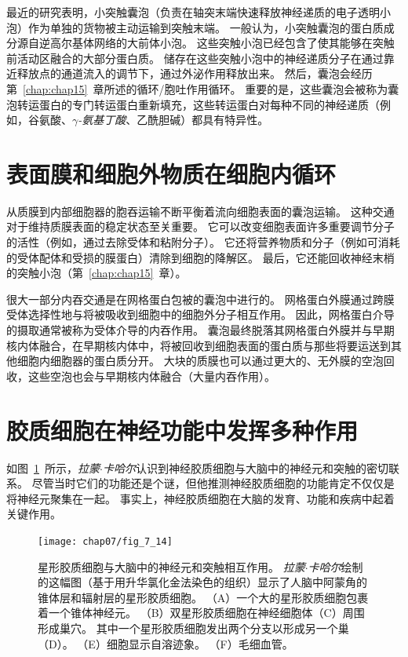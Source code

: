 最近的研究表明，小突触囊泡（负责在轴突末端快速释放神经递质的电子透明小泡）作为单独的货物被主动运输到突触末端。
一般认为，小突触囊泡的蛋白质成分源自逆高尔基体网络的大前体小泡。
这些突触小泡已经包含了使其能够在突触前活动区融合的大部分蛋白质。
储存在这些突触小泡中的神经递质分子在通过靠近释放点的通道流入的调节下，通过外泌作用释放出来。
然后，囊泡会经历第~\ref{chap:chap15}~章所述的循环/胞吐作用循环。
重要的是，这些囊泡会被称为囊泡转运蛋白的专门转运蛋白重新填充，这些转运蛋白对每种不同的神经递质（例如，谷氨酸、\textit{$\gamma$-氨基丁酸}、乙酰胆碱）都具有特异性。



\section{表面膜和细胞外物质在细胞内循环}

从质膜到内部细胞器的胞吞运输不断平衡着流向细胞表面的囊泡运输。
这种交通对于维持质膜表面的稳定状态至关重要。
它可以改变细胞表面许多重要调节分子的活性（例如，通过去除受体和粘附分子）。
它还将营养物质和分子（例如可消耗的受体配体和受损的膜蛋白）清除到细胞的降解区。
最后，它还能回收神经末梢的突触小泡（第~\ref{chap:chap15}~章）。


很大一部分内吞交通是在网格蛋白包被的囊泡中进行的。 
网格蛋白外膜通过跨膜受体选择性地与将被吸收到细胞中的细胞外分子相互作用。
因此，网格蛋白介导的摄取通常被称为受体介导的内吞作用。
囊泡最终脱落其网格蛋白外膜并与早期核内体融合，在早期核内体中，将被回收到细胞表面的蛋白质与那些将要运送到其他细胞内细胞器的蛋白质分开。
大块的质膜也可以通过更大的、无外膜的空泡回收，这些空泡也会与早期核内体融合（大量内吞作用）。



\section{胶质细胞在神经功能中发挥多种作用}

如图~\ref{fig:7_14}~所示，\textit{拉蒙$\cdot$卡哈尔}认识到神经胶质细胞与大脑中的神经元和突触的密切联系。
尽管当时它们的功能还是个谜，但他推测神经胶质细胞的功能肯定不仅仅是将神经元聚集在一起。
事实上，神经胶质细胞在大脑的发育、功能和疾病中起着关键作用。


\begin{figure}[htbp]
	\centering
	\texttt{[image: chap07/fig\_7\_14]}
	\caption{星形胶质细胞与大脑中的神经元和突触相互作用。
		\textit{拉蒙$\cdot$卡哈尔}绘制的这幅图（基于用升华氯化金法染色的组织）显示了人脑中阿蒙角的锥体层和辐射层的星形胶质细胞。
		（A）一个大的星形胶质细胞包裹着一个锥体神经元。
		（B）双星形胶质细胞在神经细胞体（C）周围形成巢穴。
		其中一个星形胶质细胞发出两个分支以形成另一个巢（D）。 
		（E）细胞显示自溶迹象。
		（F）毛细血管。 }
	\label{fig:7_14}
\end{figure}



